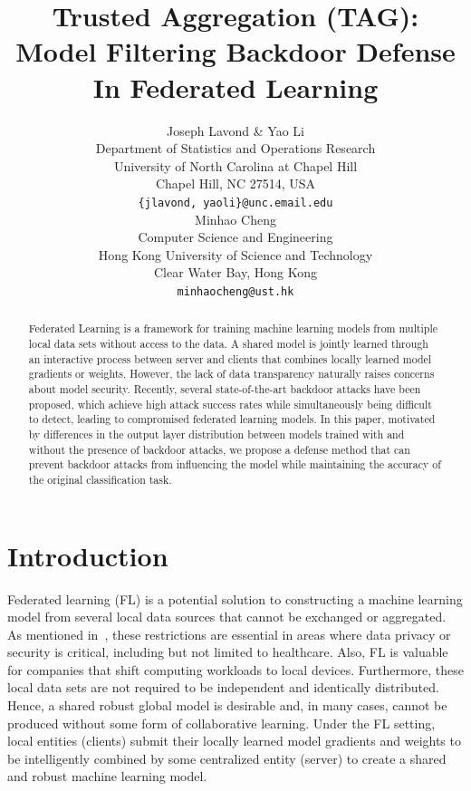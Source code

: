 \documentclass{article} %
\title{
    Trusted Aggregation (TAG): Model Filtering Backdoor Defense In Federated Learning
}
\author{%
    Joseph Lavond \& Yao Li  \\
    Department of Statistics and Operations Research \\
    University of North Carolina at Chapel Hill \\
    Chapel Hill, NC 27514, USA \\
    \texttt{\{jlavond, yaoli\}@unc.email.edu} \\
    \And
    Minhao Cheng \\
    Computer Science and Engineering \\
    Hong Kong University of Science and Technology \\
    Clear Water Bay, Hong Kong \\
    \texttt{minhaocheng@ust.hk}
}
\begin{document}
\maketitle

\begin{abstract}
Federated Learning is a framework for training machine learning models from multiple local data sets without access to the data. A shared model is jointly learned through an interactive process between server and clients that combines locally learned model gradients or weights. However, the lack of data transparency naturally raises concerns about model security. Recently, several state-of-the-art backdoor attacks have been proposed, which achieve high attack success rates while simultaneously being difficult to detect, leading to compromised federated learning models. In this paper, motivated by differences in the output layer distribution between models trained with and without the presence of backdoor attacks, we propose a defense method that can prevent backdoor attacks from influencing the model while maintaining the accuracy of the original classification task.
\end{abstract}

\section{Introduction}

Federated learning (FL) is a potential solution to constructing a machine learning model from several local data sources that cannot be exchanged or aggregated. As mentioned in~\cite{fed-learn}, these restrictions are essential in areas where data privacy or security is critical, including but not limited to healthcare.  Also, FL is valuable for companies that shift computing workloads to local devices. Furthermore, these local data sets are not required to be independent and identically distributed. Hence, a shared robust global model is desirable and, in many cases, cannot be produced without some form of collaborative learning. Under the FL setting, local entities (clients) submit their locally learned model gradients and weights to be intelligently combined by some centralized entity (server) to create a shared and robust machine learning model.
\end{document}
